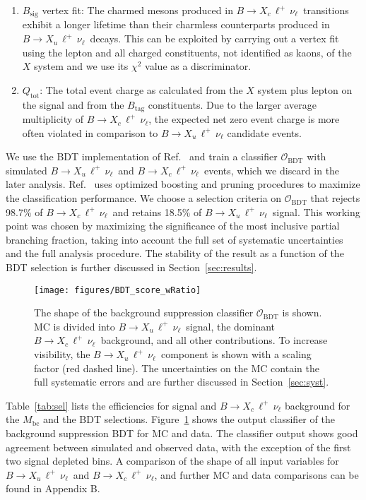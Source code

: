 \documentclass[twocolumn,aps,prd,superscriptaddress,nofootinbib,floatfix,preprintnumbers,a4]{revtex4-1}
\newcommand{\bulnu}{\ensuremath{B \to X_u \, \ell^+\, \nu_{\ell}}\xspace}
\newcommand{\bclnu}{\ensuremath{B \to X_c \, \ell^+\, \nu_{\ell}}\xspace}
\begin{document}
\begin{enumerate}
\item $B_{\mathrm{sig}}$ vertex fit: The charmed mesons produced in \bclnu\ transitions exhibit a longer lifetime than their charmless counterparts produced in \bulnu\ decays. This can be exploited by carrying out a vertex fit using the lepton and all charged constituents, not identified as kaons, of the $X$ system and we use its $\chi^2$ value as a discriminator. 
\item $Q_{\mathrm{tot}}$: The total event charge as calculated from the $X$ system plus lepton on the signal and from the $B_{\mathrm{tag}}$ constituents. Due to the larger average multiplicity of \bclnu, the expected net zero event charge is more often violated in comparison to \bulnu candidate events. 
\end{enumerate}
We use the BDT implementation of Ref.~\cite{Chen:2016:XST:2939672.2939785} and train a classifier $\mathcal{O}_{\mathrm{BDT}}$ with simulated \bulnu\ and \bclnu\ events, which we discard in the later analysis. Ref.~\cite{Chen:2016:XST:2939672.2939785} uses optimized boosting and pruning procedures to maximize the classification performance. We choose a selection criteria on $\mathcal{O}_{\mathrm{BDT}}$ that rejects 98.7\% of \bclnu\ and retains 18.5\% of \bulnu\ signal. This working point was chosen by maximizing the significance of the most inclusive partial branching fraction, taking into account the full set of systematic uncertainties and the full analysis procedure. The stability of the result as a function of the BDT selection is further discussed in Section~\ref{sec:results}. 
 
 \begin{figure}[t!]
  \texttt{[image: figures/BDT\_score\_wRatio]} 
\caption{
The shape of the background suppression classifier $\mathcal{O}_{\mathrm{BDT}}$ is shown. MC is divided into \bulnu\ signal, the dominant \bclnu\ background, and all other contributions. To increase visibility, the \bulnu\ component is shown with a scaling factor (red dashed line). The uncertainties on the MC contain the full systematic errors and are further discussed in Section~\ref{sec:syst}.
 }
\label{fig:bdtoutput}
\end{figure}

Table~\ref{tab:sel} lists the efficiencies for signal and \bclnu background for the $M_{\mathrm{bc}}$ and the BDT selections. Figure~\ref{fig:bdtoutput} shows the output classifier of the background suppression BDT for MC and data. The classifier output shows good agreement between simulated and observed data, with the exception of the first two signal depleted bins. A comparison of the shape of all input variables for \bulnu\ and \bclnu, and further MC and data comparisons can be found in Appendix B. 
\end{document}
